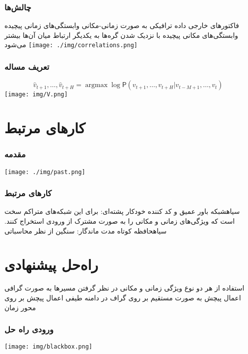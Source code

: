 \documentclass{beamer}
\begin{document}
\begin{frame}
  \frametitle{چالش‌ها\cite{2004.08555}}
   فاکتورهای خارجی
   داده ترافیکی به صورت زمانی-مکانی
   وابستگی‌های زمانی پیچیده
   وابستگی‌های مکانی پیچیده
   با نزدیک شدن گره‌ها به یکدیگر ارتباط میان آن‌ها بیشتر می‌شود
  \centering
  \texttt{[image: ./img/correlations.png]}
\end{frame}

\begin{frame}
  \frametitle{تعریف مساله}
  \begin{equation}
    \label{eq:base}
    \hat{v}_{t+1}, \ldots,  \hat{v}_{t+H} = \mathop{\mathrm{argmax}} \log \mathsf{P}({v}_{t+1}, \ldots,  v_{t+H} | v_{t-M+1} , \ldots,  v_{t})
  \end{equation}
  \centering
  \texttt{[image: img/V.png]}
\end{frame}

\section{کارهای مرتبط}

\begin{frame}
  \frametitle{مقدمه\cite{1709.04875}}
  \texttt{[image: ./img/past.png]}
\end{frame}

\begin{frame}
  \frametitle{کارهای مرتبط}
   ‌سیاه{شبکه باور عمیق و کد کننده خودکار پشته‌ای}: برای این شبکه‌های متراکم
  سخت است که ویژگی‌های زمانی و مکانی را به صورت مشترک از ورودی استخراج کنند.
   ‌سیاه{حافظه کوتاه مدت ماندگار}: سنگین از نظر محاسباتی
\end{frame}

\section{راه‌حل پیشنهادی}

\begin{frame}
   استفاده از هر دو نوع ویژگی زمانی و مکانی
   در نظر گرفتن مسیرها به صورت گرافی
   اعمال پیچش به صورت مستقیم بر روی گراف در دامنه طیفی
   اعمال پیچش بر روی محور زمان
\end{frame}

\begin{frame}
  \frametitle{ورودی راه حل}
  \texttt{[image: img/blackbox.png]}
\end{frame}
\end{document}
